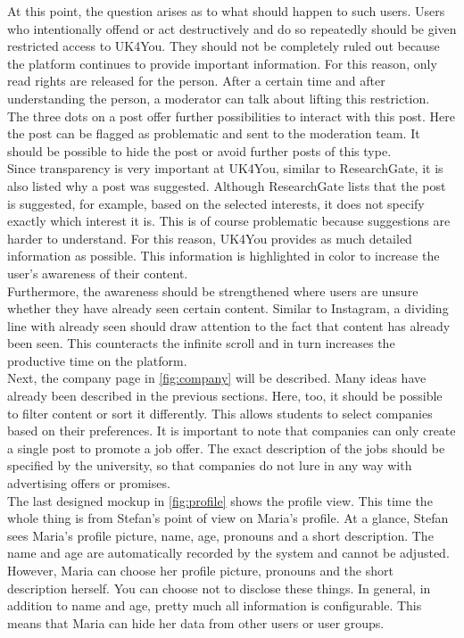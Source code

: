 At this point, the question arises as to what should happen to such users.
Users who intentionally offend or act destructively and do so repeatedly should be given restricted access to UK4You.
They should not be completely ruled out because the platform continues to provide important information.
For this reason, only read rights are released for the person.
After a certain time and after understanding the person, a moderator can talk about lifting this restriction.\\

The three dots on a post offer further possibilities to interact with this post.
Here the post can be flagged as problematic and sent to the moderation team.
It should be possible to hide the post or avoid further posts of this type.\\

Since transparency is very important at UK4You, similar to ResearchGate, it is also listed why a post was suggested.
Although ResearchGate lists that the post is suggested, for example, based on the selected interests, it does not specify exactly which interest it is.
This is of course problematic because suggestions are harder to understand. 
For this reason, UK4You provides as much detailed information as possible.
This information is highlighted in color to increase the user's awareness of their content.\\

Furthermore, the awareness should be strengthened where users are unsure whether they have already seen certain content.
Similar to Instagram, a dividing line with already seen should draw attention to the fact that content has already been seen.
This counteracts the infinite scroll and in turn increases the productive time on the platform.\\

Next, the company page in \autoref{fig:company} will be described.
Many ideas have already been described in the previous sections.
Here, too, it should be possible to filter content or sort it differently. 
This allows students to select companies based on their preferences.
It is important to note that companies can only create a single post to promote a job offer.
The exact description of the jobs should be specified by the university, so that companies do not lure in any way with advertising offers or promises.\\

The last designed mockup in \autoref{fig:profile} shows the profile view.
This time the whole thing is from Stefan's point of view on Maria's profile.
At a glance, Stefan sees Maria's profile picture, name, age, pronouns and a short description.
The name and age are automatically recorded by the system and cannot be adjusted.
However, Maria can choose her profile picture, pronouns and the short description herself.
You can choose not to disclose these things.
In general, in addition to name and age, pretty much all information is configurable.
This means that Maria can hide her data from other users or user groups.\\

